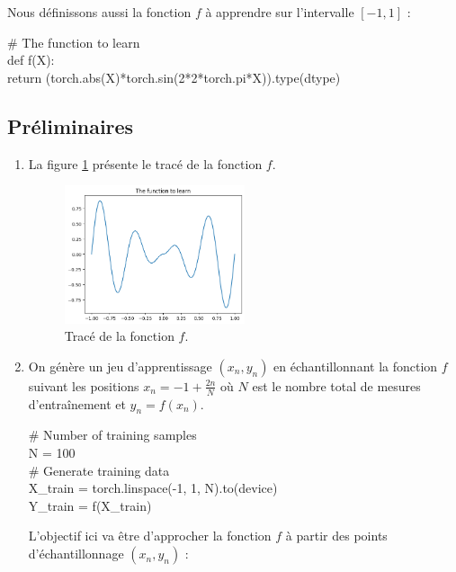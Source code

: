 \documentclass[12pt,a4paper]{article}
\newcommand{\code}[1]{%
    \begin{tcolorbox}[colback=black!10!white,colframe=black]
        #1
    \end{tcolorbox}
}
\begin{document}
Nous définissons aussi la fonction $f$ à apprendre sur l’intervalle $[-1, 1]$ :\\

\code{
    \# The function to learn\\
    def f(X):\\
    \indent \qquad return (torch.abs(X)*torch.sin(2*2*torch.pi*X)).type(dtype)
}

\subsection{Préliminaires}

\begin{enumerate}
    \item La figure \ref{fig:trace_f} présente le tracé de la fonction $f$.
    
    \begin{figure}[ht]
        \centering
        \includegraphics[width=0.5\textwidth]{src/trace_f.png}
        \caption{Tracé de la fonction $f$.}
        \label{fig:trace_f}
    \end{figure}


    \item On génère un jeu d'apprentissage $(x_n, y_n)$ en échantillonnant la fonction $f$ suivant les positions $x_n = -1 + \frac{2n}{N}$ où $N$ est le nombre total de mesures d’entraînement et $y_n = f(x_n)$.
    
    \code{
        \# Number of training samples\\
        N = 100\\

        \# Generate training data\\
        X\_train = torch.linspace(-1, 1, N).to(device)\\
        Y\_train = f(X\_train)
    }

    L’objectif ici va être d’approcher la fonction $f$ à partir des points d’échantillonnage $(x_n, y_n)$ :


\end{enumerate}
\end{document}
